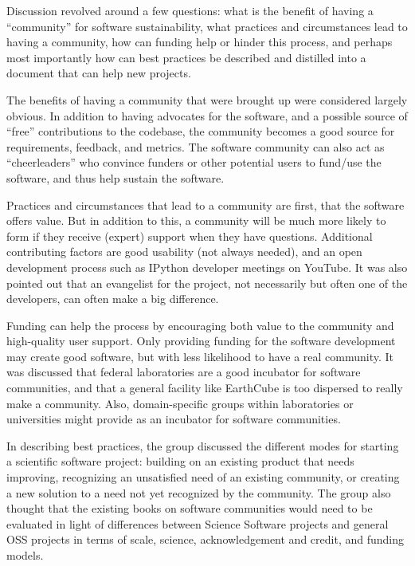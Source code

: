 Discussion revolved around a few questions: what is the benefit of having a
``community'' for software sustainability, what practices and circumstances lead
to having a community, how can funding help or hinder this process, and perhaps
most importantly how can best practices be described and distilled into a
document that can help new projects.

The benefits of having a community that were brought up were considered largely
obvious. In addition to having advocates for the software, and a possible source
of ``free'' contributions to the codebase, the community becomes a good source
for requirements, feedback, and metrics. The software community can also act as
``cheerleaders'' who convince funders or other potential users to fund/use the
software, and thus help sustain the software.

Practices and circumstances that lead to a community are first, that the
software offers value. But in addition to this, a community will be much more
likely to form if they receive (expert) support when they have questions.
Additional contributing factors are good usability (not always needed), and an
open development process such as IPython developer meetings on YouTube. It was
also pointed out that an evangelist for the project, not necessarily but often
one of the developers, can often make a big difference.

Funding can help the process by encouraging both value to the community and
high-quality user support. Only providing funding for the software development
may create good software, but with less likelihood to have a real community. It
was discussed that federal laboratories are a good incubator for software
communities, and that a general facility like EarthCube is too dispersed to
really make a community. Also, domain-specific groups within laboratories or
universities might provide as an incubator for software communities.

In describing best practices, the group discussed the different modes for
starting a scientific software project: building on an existing product that
needs improving, recognizing an unsatisfied need of an existing community, or
creating a new solution to a need not yet recognized by the community. The group
also thought that the existing books on software communities would need to be
evaluated in light of differences between Science Software projects and general
OSS projects in terms of scale, science, acknowledgement and credit, and funding
models.


